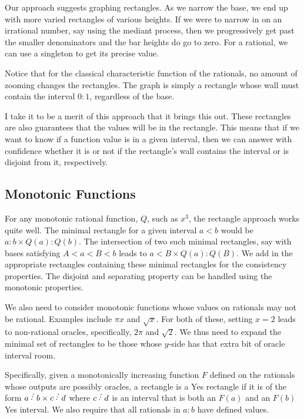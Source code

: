 \documentclass[12pt]{article}
\theoremstyle{remark}
\begin{document}
Our approach suggests graphing rectangles. As we narrow the base, we end up with more varied rectangles of various heights. If we were to narrow in on an irrational number, say using the mediant process, then we progressively get past the smaller denominators and the bar heights do go to zero. For a rational, we can use a singleton to get its precise value. 

Notice that for the classical characteristic function of the rationals, no amount of zooming changes the rectangles. The graph is simply a rectangle whose wall must contain the interval $0:1$, regardless of the base. 

I take it to be a merit of this approach that it brings this out. These rectangles are also guarantees that the values will be in the rectangle. This means that if we want to know if a function value is in a given interval, then we can answer with confidence whether it is or not if the rectangle's wall contains the interval or is disjoint from it, respectively. 


\subsection{Monotonic Functions}

For any monotonic rational function, $Q$, such as $x^3$, the rectangle approach works quite well. The minimal rectangle for a given interval $a \lt b$ would be $a:b \times Q(a):Q(b)$. The intersection of two such minimal rectangles, say with bases satisfying $A \lt a \lt B \lt b$ leads to $a \lt B  \times  Q(a):Q(B) $. We add in the appropriate rectangles containing these minimal rectangles for the consistency properties. The disjoint and separating property can be handled using the monotonic properties. 

We also need to consider monotonic functions whose values on rationals may not be rational. Examples include $\pi x$ and $\sqrt{x}$. For both of these, setting $x=2$ leads to non-rational oracles, specifically, $2 \pi$ and $\sqrt{2}$. We thus need to expand the minimal set of rectangles to be those whose $y$-side has that extra bit of oracle interval room. 

Specifically, given a monotonically increasing function $F$ defined on the rationals whose outputs are possibly oracles, a rectangle is a Yes rectangle if it is of the form  $a \lte b \times c\lte d$  where $c \lte d$ is an interval that is both an $F(a)$ and an $F(b)$ Yes interval.  We also require that all rationals in $a:b$ have defined values. 
\end{document}
